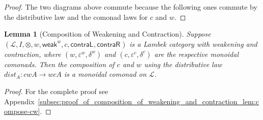 \documentclass{article}
\newtheorem{lemma}[theorem]{Lemma}
\let\mto\to
\let\to\relax
\newcommand{\to}{\rightarrow}
\newcommand{\cat}[1]{\mathcal{#1}}
\newcommand{\w}[1]{\mathsf{weak}_{#1}}
\newcommand{\cL}[1]{\mathsf{contraL}_{#1}}
\newcommand{\cR}[1]{\mathsf{contraR}_{#1}}
\begin{document}
\begin{proof}
  The two diagrams above commute because the following ones commute by the
  distributive law and the comonad laws for $c$ and $w$.
\end{proof}

\begin{lemma}[Composition of Weakening and Contraction]
  \label{lem:compose-cw}
  Suppose \\ $(\cat{L},I,\otimes,w,\w{}^w,c,\cL{},\cR{})$ is a Lambek
  category with weakening and contraction, where
  $(w,\varepsilon^w,\delta^w)$ and $(c,\varepsilon^c,\delta^c)$ are
  the respective monoidal comonads. Then the composition of $c$ and
  $w$ using the distributive law $dist_A:cwA\mto wcA$ is a monoidal
  comonad on $\cat{L}$.
\end{lemma}
\begin{proof}
  For the complete proof see
  Appendix~\ref{subsec:proof_of_composition_of_weakening_and_contraction_lem:compose-cw}.
\end{proof}
\end{document}
